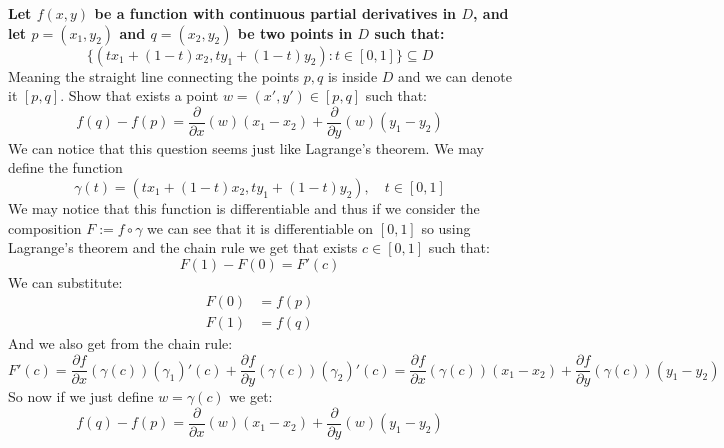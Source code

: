 \documentclass[11pt,a4paper]{article}
\begin{document}
	\textbf{Let $f(x,y)$ be a function with continuous partial derivatives
	in $D$, and let $p=(x_1,y_2)$ and $q=(x_2,y_2)$ be two points in $D$
	such that:
	\[
		\{(tx_1+(1-t)x_2, ty_1+(1-t)y_2) \colon t\in[0,1]\} \subseteq D
	\]}
	Meaning the straight line connecting the points $p,q$ is inside $D$
	and we can denote it $[p,q]$. Show that exists a point $w=(x',y')\in[p,q]$
	such that:
	\[
		f(q) - f(p) = 
		\frac{\partial}{\partial x}(w)(x_1-x_2) +
		\frac{\partial}{\partial y}(w)(y_1-y_2)
	\]
	We can notice that this question seems just like Lagrange's theorem.
	We may define the function 
	\[
		\gamma(t) = (tx_1+(1-t)x_2, ty_1+(1-t)y_2), \quad t\in[0,1]
	\]
	We may notice that this function is differentiable and thus if we consider
	the composition $F := f\circ\gamma$ we can see that it is differentiable
	on $[0,1]$ so using Lagrange's theorem and the chain rule we get that
	exists $c\in[0,1]$ such that:
	\[
		F(1) - F(0) = F'(c)
	\]
	We can substitute:
	\begin{align*}
		F(0) &= f(p) \\
		F(1) &= f(q)
	\end{align*}
	And we also get from the chain rule:
	\[
		F'(c) =
		\frac{\partial f}{\partial x}(\gamma(c))(\gamma_1)'(c) + 
		\frac{\partial f}{\partial y}(\gamma(c))(\gamma_2)'(c) = 
		\frac{\partial f}{\partial x}(\gamma(c))(x_1-x_2) + 
		\frac{\partial f}{\partial y}(\gamma(c))(y_1-y_2)
	\]
	So now if we just define $w = \gamma(c)$ we get:
	\[
		f(q) - f(p) = 
		\frac{\partial}{\partial x}(w)(x_1-x_2) +
		\frac{\partial}{\partial y}(w)(y_1-y_2)
	\]
	
	\newpage
	
\end{document}
